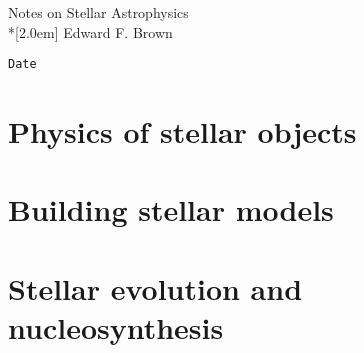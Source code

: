 \documentclass[11pt]{book}
\begin{document}
\newcommand{\thetitle}{Notes on Stellar Astrophysics}
\newcommand{\theauthor}{Edward F. Brown}

\begin{titlepage}
\vspace*{2.5in}
\begin{center}
\LARGE{\thetitle}\\*[2.0em]
\large{\theauthor}
\end{center}
\vspace*{3.0in}
\small{\verb$Date$}
\end{titlepage}

\tableofcontents

\part{Physics of stellar objects}





\part{Building stellar models}



\part{Stellar evolution and nucleosynthesis}






\appendix




\end{document}
